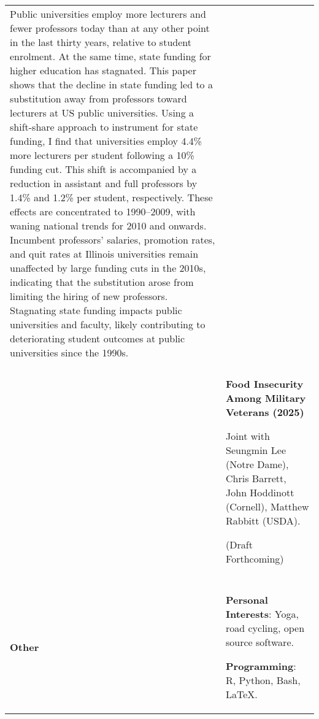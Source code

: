 \documentclass[letterpaper,11pt,oneside]{article}
\begin{document}
\begin{longtable}[\textwidth]{p{} p{}}
    Public universities employ more lecturers and fewer professors today than at any other point in the last thirty years, relative to student enrolment.
    At the same time, state funding for higher education has stagnated.
    This paper shows that the decline in state funding led to a substitution away from professors toward lecturers at US public universities.
    Using a shift-share approach to instrument for state funding, I find that universities employ 4.4\% more lecturers per student following a 10\% funding cut.
    This shift is accompanied by a reduction in assistant and full professors by 1.4\% and 1.2\%  per student, respectively.
    These effects are concentrated to 1990--2009, with waning national trends for 2010 and onwards.
    Incumbent professors' salaries, promotion rates, and quit rates at Illinois universities remain unaffected by large funding cuts in the 2010s, indicating that the substitution arose from limiting the hiring of new professors.
    Stagnating state funding impacts public universities and faculty, likely contributing to deteriorating student outcomes at public universities since the 1990s. \\ \\

    & \textbf{Food Insecurity Among Military Veterans (2025)}

    Joint with Seungmin Lee (Notre Dame), Chris Barrett, John Hoddinott (Cornell), Matthew Rabbitt (USDA).

    (Draft Forthcoming) \\ \\

\vfill \textbf{Other}
    & \vfill \textbf{Personal Interests}: Yoga, road cycling, open source software.
    
    \textbf{Programming}: R, Python, Bash, \LaTeX.
\end{longtable}
\end{document}
